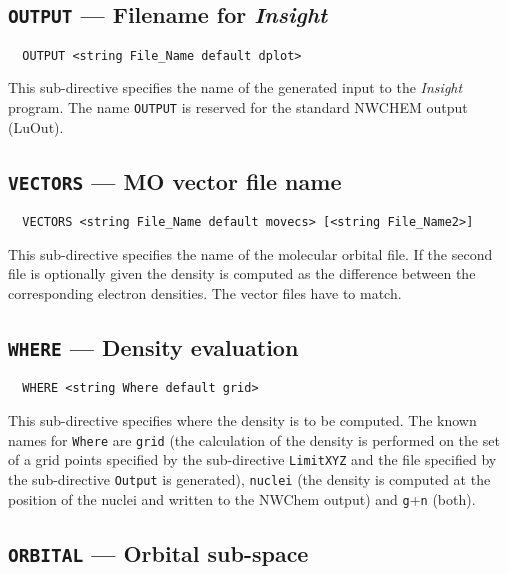 \subsection{{\tt OUTPUT} --- Filename for {\em Insight}}

\begin{verbatim}
  OUTPUT <string File_Name default dplot>
\end{verbatim}

This sub-directive specifies the name of the generated input to the
{\em Insight} program. The name \verb+OUTPUT+ is reserved for the
standard NWCHEM output (LuOut).



\subsection{{\tt VECTORS} --- MO vector file name}

\begin{verbatim}
  VECTORS <string File_Name default movecs> [<string File_Name2>]
\end{verbatim}

This sub-directive specifies the name of the molecular orbital file.
If the second file is optionally given the density is computed as the
difference between the corresponding electron densities. The vector 
files have to match.



\subsection{{\tt WHERE} --- Density evaluation}

\begin{verbatim}
  WHERE <string Where default grid>
\end{verbatim}

This sub-directive specifies where the density is to be computed.
The known names for \verb+Where+ are \verb+grid+ (the calculation of
the density is performed on the set of a grid points specified by the
sub-directive \verb+LimitXYZ+ and the file specified by the sub-directive
\verb+Output+ is generated), \verb+nuclei+ (the density is computed at
the position of the nuclei and written to the NWChem output) and
\verb+g++\verb+n+ (both).


\subsection{{\tt ORBITAL} --- Orbital sub-space}

